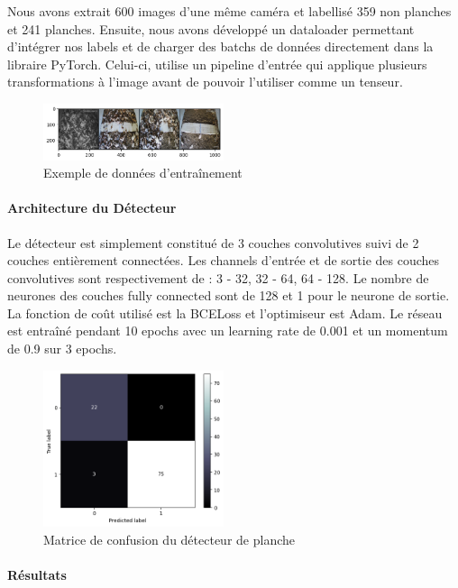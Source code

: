 Nous avons extrait 600 images d'une même caméra et labellisé 359 non planches et 241 planches. Ensuite, nous avons développé un dataloader permettant d'intégrer nos labels et de charger des batchs de données directement dans la libraire PyTorch. Celui-ci, utilise un pipeline d'entrée qui applique plusieurs transformations à l'image avant de pouvoir l'utiliser comme un tenseur.

\begin{figure}[!htb]
    \centering
    \includegraphics[width=200px]{images/filtre_exemple_data}
    \caption{Exemple de données d'entraînement}
    \label{fig:Entraînement du filtre}
\end{figure}

\paragraph*{Architecture du Détecteur}

Le détecteur est simplement constitué de 3 couches convolutives suivi de 2 couches entièrement connectées. Les channels d'entrée et de sortie des couches convolutives sont respectivement de : 3 - 32, 32 - 64, 64 - 128. Le nombre de neurones des couches fully connected sont de 128 et 1 pour le neurone de sortie. La fonction de coût utilisé est la BCELoss et l'optimiseur est Adam. Le réseau est entraîné pendant 10 epochs avec un learning rate de 0.001 et un momentum de 0.9 sur 3 epochs.

\begin{figure}[!htb]
    \centering
    \includegraphics[width=200px]{images/filtre_cmatrix}
    \caption{Matrice de confusion du détecteur de planche}
    \label{fig:Matrice de confusion du filtre}
\end{figure}

\paragraph*{Résultats}

